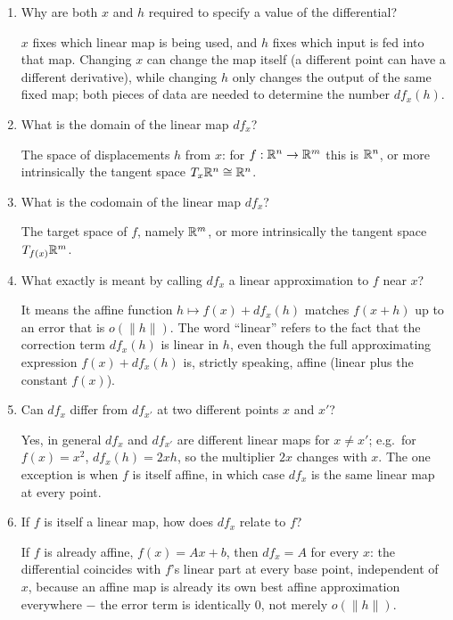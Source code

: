 \documentclass{essay}
\begin{document}
\begin{enumerate}[resume, leftmargin=*, itemsep=8pt]
\item Why are both \(x\) and \(h\) required to specify a value of the differential?
\begin{answer}
\(x\) fixes which linear map is being used, and \(h\) fixes which input is fed into that map. Changing \(x\) can change the map itself (a different point can have a different derivative), while changing \(h\) only changes the output of the same fixed map; both pieces of data are needed to determine the number \(df_x(h)\).
\end{answer}

\item What is the domain of the linear map \(df_x\)?
\begin{answer}
The space of displacements \(h\) from \(x\): for \(f:\mathbb{R}^n\to\mathbb{R}^m\) this is \(\mathbb{R}^n\), or more intrinsically the tangent space \(T_x\mathbb{R}^n\cong\mathbb{R}^n\).
\end{answer}

\item What is the codomain of the linear map \(df_x\)?
\begin{answer}
The target space of \(f\), namely \(\mathbb{R}^m\), or more intrinsically the tangent space \(T_{f(x)}\mathbb{R}^m\).
\end{answer}

\item What exactly is meant by calling \(df_x\) a linear approximation to \(f\) near \(x\)?
\begin{answer}
It means the affine function \(h\mapsto f(x)+df_x(h)\) matches \(f(x+h)\) up to an error that is \(o(\|h\|)\). The word ``linear'' refers to the fact that the correction term \(df_x(h)\) is linear in \(h\), even though the full approximating expression \(f(x)+df_x(h)\) is, strictly speaking, affine (linear plus the constant \(f(x)\)).
\end{answer}

\item Can \(df_x\) differ from \(df_{x'}\) at two different points \(x\) and \(x'\)?
\begin{answer}
Yes, in general \(df_x\) and \(df_{x'}\) are different linear maps for \(x\ne x'\); e.g.\ for \(f(x)=x^2\), \(df_x(h)=2xh\), so the multiplier \(2x\) changes with \(x\). The one exception is when \(f\) is itself affine, in which case \(df_x\) is the same linear map at every point.
\end{answer}

\item If \(f\) is itself a linear map, how does \(df_x\) relate to \(f\)?
\begin{answer}
If \(f\) is already affine, \(f(x)=Ax+b\), then \(df_x=A\) for every \(x\): the differential coincides with \(f\)'s linear part at every base point, independent of \(x\), because an affine map is already its own best affine approximation everywhere \(-\) the error term is identically \(0\), not merely \(o(\|h\|)\).
\end{answer}


\end{enumerate}
\end{document}

